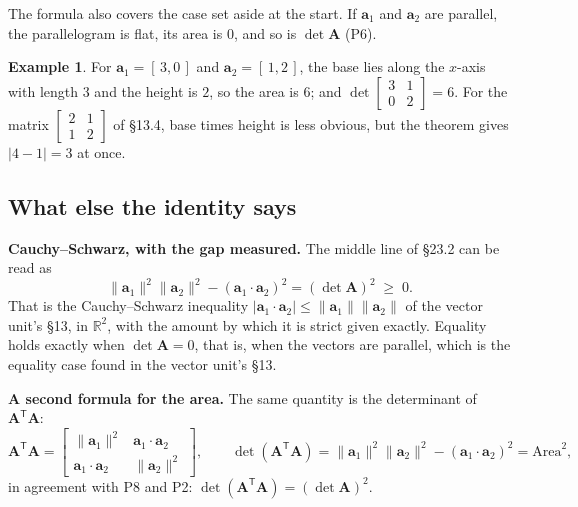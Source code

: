\documentclass[11pt]{article}
\theoremstyle{plain}
\theoremstyle{definition}
\newtheorem{ex}{Example}[section]
\theoremstyle{remark}
\newcommand{\R}{\mathbb{R}}
\newcommand{\vc}[1]{\mathbf{#1}}
\newcommand{\mt}[1]{\mathbf{#1}}
\newcommand{\norm}[1]{\lVert #1\rVert}
\newcommand{\T}{^{\mathsf{T}}}
\begin{document}
\noindent The formula also covers the case set aside at the start. If
$\vc{a}_1$ and $\vc{a}_2$ are parallel, the parallelogram is flat, its area is
$0$, and so is $\det\mt{A}$ (P6).

\begin{ex}
For $\vc{a}_1=[\,3,0\,]$ and $\vc{a}_2=[\,1,2\,]$, the base lies along the
$x$-axis with length $3$ and the height is $2$, so the area is $6$; and
$\det\begin{bmatrix}3&1\\0&2\end{bmatrix}=6$. For the matrix
$\begin{bmatrix}2&1\\1&2\end{bmatrix}$ of \S13.4, base times height is less
obvious, but the theorem gives $|4-1|=3$ at once.
\end{ex}

\subsection{What else the identity says}
\textbf{Cauchy--Schwarz, with the gap measured.} The middle line of \S23.2 can
be read as
\[
  \norm{\vc{a}_1}^{2}\norm{\vc{a}_2}^{2}-(\vc{a}_1\cdot\vc{a}_2)^{2}
  =(\det\mt{A})^{2}\;\ge\;0 .
\]
That is the Cauchy--Schwarz inequality
$|\vc{a}_1\cdot\vc{a}_2|\le\norm{\vc{a}_1}\norm{\vc{a}_2}$ of the vector unit's
\S13, in $\R^{2}$, with the amount by which it is strict given exactly. Equality
holds exactly when $\det\mt{A}=0$, that is, when the vectors are parallel, which
is the equality case found in the vector unit's \S13.

\textbf{A second formula for the area.} The same quantity is the determinant
of $\mt{A}\T\mt{A}$:
\[
  \mt{A}\T\mt{A}=\begin{bmatrix}\norm{\vc{a}_1}^{2}&\vc{a}_1\cdot\vc{a}_2\\
                 \vc{a}_1\cdot\vc{a}_2&\norm{\vc{a}_2}^{2}\end{bmatrix},
  \qquad
  \det(\mt{A}\T\mt{A})=\norm{\vc{a}_1}^{2}\norm{\vc{a}_2}^{2}-(\vc{a}_1\cdot\vc{a}_2)^{2}
  =\text{Area}^{2},
\]
in agreement with P8 and P2: $\det(\mt{A}\T\mt{A})=(\det\mt{A})^{2}$.

\end{document}
